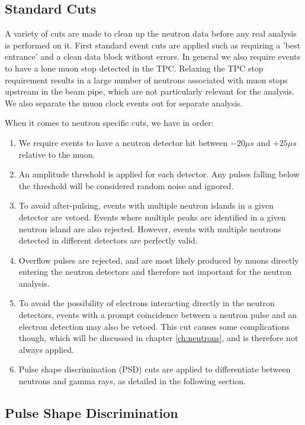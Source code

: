 \subsection{Standard Cuts}

A variety of cuts are made to clean up the neutron data before any real analysis is performed on it.
First standard event cuts are applied such as requiring a 'best entrance' and a clean data block without errors.
In general we also require events to have a lone muon stop detected in the TPC.
Relaxing the TPC stop requirement results in a large number of neutrons associated with muon stops upstream in the beam pipe, which are not particularly relevant for the analysis.
We also separate the muon clock events out for separate analysis.

When it comes to neutron specific cuts, we have in order:
\begin{enumerate}
  \item We require events to have a neutron detector hit between $-20 \mu s$ and $+25 \mu s$ relative to the muon. 
  \item An amplitude threshold is applied for each detector.  Any pulses falling below the threshold will be considered random noise and ignored.
  \item To avoid after-pulsing, events with multiple neutron islands in a given detector are vetoed.  Events where multiple peaks are identified in a given neutron island are also rejected.  However, events with multiple neutrons detected in different detectors are perfectly valid.
  \item Overflow pulses are rejected, and are most likely produced by muons directly entering the neutron detectors and therefore not important for the neutron analysis.
  \item To avoid the possibility of electrons interacting directly in the neutron detectors, events with a prompt coincidence between a neutron pulse and an electron detection may also be vetoed.  This cut causes some complications though, which will be discussed in chapter \ref{ch:neutrons}, and is therefore not always applied.  
  \item Pulse shape discrimination (PSD) cuts are applied to differentiate between neutrons and gamma rays, as detailed in the following section.
\end{enumerate}

\subsection{Pulse Shape Discrimination}

